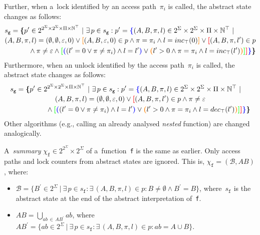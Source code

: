 Further, when a~lock identified by an access path~$ \pi_i $ is called, the abstract state changes as follows:
$$
\begin{multlined}
    s_\mathtt{g} = \bb{\{}p^\prime \in 2^{2^\Sigma \times 2^\Sigma \times \Pi \times \mathbb{N}^\top}\ |\ \exists\,p \in s_\mathtt{g} : p^\prime = \bA{\{} (A, B, \pi, l) \in 2^\Sigma \times 2^\Sigma \times \Pi \times \mathbb{N}^\top\ |\ \\
%
    (A, B, \pi, l) = (\emptyset, \emptyset, \varepsilon, 0) \vee \bB{[}(A, B, \varepsilon, 0) \in p \wedge \pi = \pi_i \wedge l = inc_\top(0)\bB{]} \vee \bC{[}(A, B, \pi, l^\prime) \in p \\
%
    \wedge \pi \neq \varepsilon \wedge \bD{[}\bA{(}(l^\prime = 0 \vee \pi \neq \pi_i) \wedge l = l^\prime\bA{)} \vee \bB{(}l^\prime > 0 \wedge \pi = \pi_i \wedge l = inc_\top(l^\prime)%
%
    \bB{)}\bD{]}\bC{]}\bA{\}}\bb{\}}
\end{multlined}
$$
Furthermore, when an unlock identified by the access path~$ \pi_i $ is called, the abstract state changes as follows: 
$$
\begin{multlined}
    s_\mathtt{g} = \bb{\{}p^\prime \in 2^{2^\Sigma \times 2^\Sigma \times \Pi \times \mathbb{N}^\top}\ |\ \exists\,p \in s_\mathtt{g} : p^\prime = \bA{\{} (A, B, \pi, l) \in 2^\Sigma \times 2^\Sigma \times \Pi \times \mathbb{N}^\top\ |\ \\
%
    (A, B, \pi, l) = (\emptyset, \emptyset, \varepsilon, 0) \vee \bC{[}(A, B, \pi, l^\prime) \in p \wedge \pi \neq \varepsilon \\
%
    \wedge \bD{[}\bA{(}(l^\prime = 0 \vee \pi \neq \pi_i) \wedge l = l^\prime\bA{)} \vee \bB{(}l^\prime > 0 \wedge \pi = \pi_i \wedge l = dec_\top(l^\prime)%
%
    \bB{)}\bD{]}\bC{]}\bA{\}}\bb{\}}
\end{multlined}
$$
Other algorithms (e.g., calling an already analysed \emph{nested} function) are changed analogically.

A~\emph{summary} $ \chi_\mathtt{f} \in 2^{2^\Sigma} \times 2^\Sigma $ of a~function~\texttt{f} is the same as earlier. Only access paths and lock counters from abstract states are ignored. This is, $ \chi_\mathtt{f} = (\mathcal{B}, AB) $, where:
\begin{itemize}
    \item $ \mathcal{B} = \{B^\prime \in 2^\Sigma\ |\ \exists\,p \in s_\mathtt{f} : \exists\,(A, B, \pi, l) \in p : B \neq \emptyset \wedge B^\prime = B\} $, where~$ s_\mathtt{f} $ is the abstract state at the end of the abstract interpretation of~\texttt{f}.
        
    \item $ AB = \bigcup\limits_{ab\,\in\,AB^\prime} ab $, where $ AB^\prime = \{ab \in 2^\Sigma\ |\ \exists\,p \in s_\mathtt{f} : \exists\,(A, B, \pi, l) \in p : ab = A \cup B\} $.
\end{itemize}

